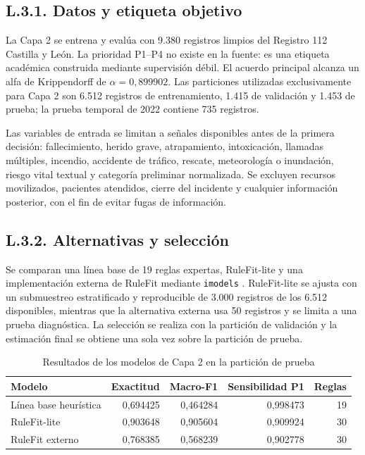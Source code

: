 \subsection*{L.3.1. Datos y etiqueta objetivo}

La Capa 2 se entrena y evalúa con 9.380 registros limpios del Registro 112 Castilla y
León. La prioridad P1--P4 no existe en la fuente: es una etiqueta académica construida
mediante supervisión débil. El acuerdo principal alcanza un alfa de Krippendorff de
\(\alpha = 0{,}899902\). Las particiones utilizadas exclusivamente para Capa 2 son 6.512
registros de entrenamiento, 1.415 de validación y 1.453 de prueba; la prueba temporal de
2022 contiene 735 registros.

Las variables de entrada se limitan a señales disponibles antes de la primera decisión:
fallecimiento, herido grave, atrapamiento, intoxicación, llamadas múltiples, incendio,
accidente de tráfico, rescate, meteorología o inundación, riesgo vital textual y
categoría preliminar normalizada. Se excluyen recursos movilizados, pacientes atendidos,
cierre del incidente y cualquier información posterior, con el fin de evitar fugas de
información.

\subsection*{L.3.2. Alternativas y selección}

Se comparan una línea base de 19 reglas expertas, RuleFit-lite y una implementación
externa de RuleFit mediante \texttt{imodels} \cite{Singh2021imodels}. RuleFit-lite se
ajusta con un submuestreo estratificado y reproducible de 3.000 registros de los 6.512
disponibles, mientras que la alternativa externa usa 50 registros y se limita a una
prueba diagnóstica. La selección se realiza con la partición de validación y la estimación
final se obtiene una sola vez sobre la partición de prueba.

\begin{table}[htbp]
\centering
\caption{Resultados de los modelos de Capa 2 en la partición de prueba}
\label{tab:model-card-capa2-comparativa}
\small
\begin{tabular}{|l|r|r|r|r|}
\hline
\textbf{Modelo} & \textbf{Exactitud} & \textbf{Macro-F1} & \textbf{Sensibilidad P1} & \textbf{Reglas} \\ \hline
Línea base heurística & 0,694425 & 0,464284 & 0,998473 & 19 \\ \hline
RuleFit-lite & 0,903648 & 0,905604 & 0,909924 & 30 \\ \hline
RuleFit externo & 0,768385 & 0,568239 & 0,902778 & 30 \\ \hline
\end{tabular}
\end{table}

